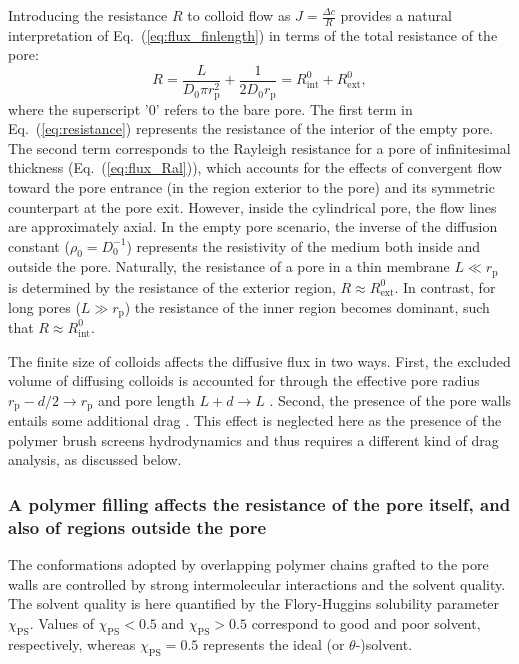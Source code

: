 \documentclass[12pt, a4paper]{article}
\begin{document}
Introducing the resistance $R$ to colloid flow as $J = \frac{\Delta c}{R}$ provides a natural interpretation of Eq.~(\ref{eq:flux_finlength}) in terms of the total resistance of the pore:
\begin{equation}
    R = \frac{L}{D_0 \pi r_{\text{p}}^{2}} + \frac{1}{2 D_0 r_{\text{p}}} = R_{\text{int}}^{0} + R_{\text{ext}}^{0},
    \label{eq:resistance}
\end{equation}
where the superscript '0' refers to the bare pore.
The first term in Eq.~(\ref{eq:resistance}) represents the resistance of the interior of the empty pore.
The second term corresponds to the Rayleigh resistance for a pore of infinitesimal thickness (Eq.~(\ref{eq:flux_Ral})), which accounts for the effects of convergent flow toward the pore entrance (in the region exterior to the pore) and its symmetric counterpart at the pore exit.
However, inside the cylindrical pore, the flow lines are approximately axial.
In the empty pore scenario, the inverse of the diffusion constant ($\rho_0=D_0^{-1}$) represents the resistivity of the medium both inside and outside the pore.
Naturally,  the resistance of a pore in a thin membrane $L \ll r_{\text{p}}$ is determined by the resistance of the exterior region, $R \approx R_{\text{ext}}^{0}$.
In contrast, for long pores ($L \gg r_{\text{p}}$) the resistance of the inner region becomes dominant, such that $R \approx R_{\text{int}}^{0}$.

The finite size of colloids affects the diffusive flux in two ways.
First, the excluded volume of diffusing colloids is accounted for through the effective pore radius $r_{\text{p}} - d/2\rightarrow r_{\text{p}} $ and pore length $L + d \rightarrow L$ \cite{Renkin1954, Beck1970, Bungay1973, Anderson1974, Brenner1977}.
Second, the presence of the pore walls entails some additional drag \cite{Ladenburg1907, Faxen1922, Haberman1958}.
This effect is neglected here as the presence of the polymer brush screens hydrodynamics and thus requires a different kind of drag analysis, as discussed below.


\subsubsection{A polymer filling affects the resistance of the pore itself, and also of regions outside the pore}

The conformations adopted by overlapping polymer chains grafted to the pore walls are controlled by strong intermolecular interactions and the solvent quality.
The solvent quality is here quantified by the Flory-Huggins solubility parameter $\chi_{\text{PS}}$.
Values of $\chi_{\text{PS}}<0.5$ and $\chi_{\text{PS}}>0.5$ correspond to good and poor solvent, respectively, whereas $\chi_{\text{PS}}=0.5$ represents the ideal (or $\theta$-)solvent.
\end{document}
